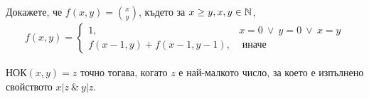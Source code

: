 \begin{problem}
  Докажете, че $f(x,y) = \binom{x}{y}$, където
  за $x \geq y, x,y\in\mathbb{N}$,
  \begin{align*}
    f(x,y) = 
    \begin{cases}
      1, & x = 0\ \vee\ y = 0\ \vee\ x = y\\
      f(x-1,y) + f(x-1,y-1), & \mbox{ иначе}
    \end{cases}
  \end{align*}
\end{problem}





$\mbox{НОК}(x,y) = z$ точно тогава, когато
$z$ е най-малкото число, за което е изпълнено свойството $x | z\ \&\ y | z$.




